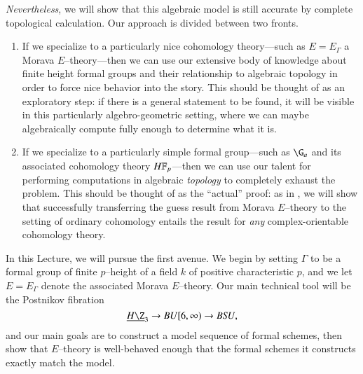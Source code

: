 \emph{Nevertheless}, we will show that this algebraic model is still accurate by complete topological calculation.  Our approach is divided between two fronts.
\begin{enumerate}
    \item If we specialize to a particularly nice cohomology theory---such as $E = E_\Gamma$ a Morava $E$--theory---then we can use our extensive body of knowledge about finite height formal groups and their relationship to algebraic topology in order to force nice behavior into the story.  This should be thought of as an exploratory step: if there is a general statement to be found, it will be visible in this particularly algebro-geometric setting, where we can maybe algebraically compute fully enough to determine what it is.
    \item If we specialize to a particularly simple formal group---such as $\G_a$ and its associated cohomology theory $\HFp$---then we can use our talent for performing computations in algebraic \emph{topology} to completely exhaust the problem.  This should be thought of as the ``actual'' proof: as in , we will show that successfully transferring the guess result from Morava $E$--theory to the setting of ordinary cohomology entails the result for \emph{any} complex-orientable cohomology theory.
\end{enumerate}

In this Lecture, we will pursue the first avenue.  We begin by setting $\Gamma$ to be a formal group of finite $p$--height of a field $k$ of positive characteristic $p$, and we let $E = E_\Gamma$ denote the associated Morava $E$--theory.  Our main technical tool will be the Postnikov fibration \[\OS{H\Z}{3} \to BU[6, \infty) \to B\SU,\] and our main goals are to construct a model sequence of formal schemes, then show that $E$--theory is well-behaved enough that the formal schemes it constructs exactly match the model.

